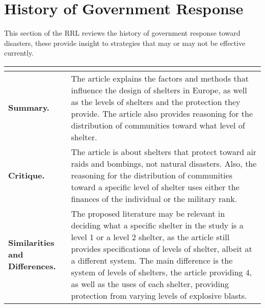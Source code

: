 \section{History of Government Response}

This section of the RRL reviews the history of government response toward disasters, these provide insight to strategies that may or may not be effective currently.

\begin{longtable}{|L{.2\linewidth}|L{.74\linewidth}|}
	\hline
	\\ \hline
	\textbf{Summary.} & The article explains the factors and methods that influence the design of shelters in Europe, as well as the levels of shelters and the protection they provide. The article also provides reasoning for the distribution of communities toward what level of shelter.\\ \hline
	\textbf{Critique.} & The article is about shelters that protect toward air raids and bombings, not natural disasters. Also, the reasoning for the distribution of communities toward a specific level of shelter uses either the finances of the individual or the military rank.\\ \hline
	\textbf{Similarities and Differences.} & The proposed literature may be relevant in deciding what a specific shelter in the study is a level 1 or a level 2 shelter, as the article still provides specifications of levels of shelter, albeit at a different system. The main difference is the system of levels of shelters, the article providing 4, as well as the uses of each shelter, providing protection from varying levels of explosive blasts. \\ \hline
\end{longtable}


